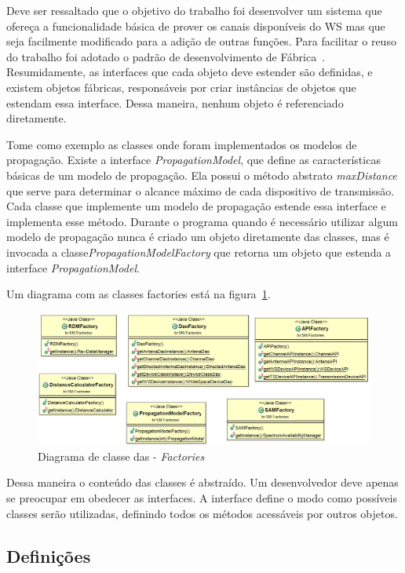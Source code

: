 Deve ser ressaltado que o objetivo do trabalho foi desenvolver um sistema que ofereça a funcionalidade básica de prover os canais disponíveis do WS mas que seja facilmente modificado para a adição de outras funções. Para facilitar o reuso do trabalho foi adotado o padrão de desenvolvimento de Fábrica~\cite{cooper2000java}. Resumidamente, as interfaces que cada objeto deve estender são definidas, e existem objetos fábricas, responsáveis por criar instâncias de objetos que estendam essa interface. Dessa maneira, nenhum objeto é referenciado diretamente.


 Tome como exemplo as classes onde foram implementados os modelos de propagação. Existe a interface \textit{PropagationModel}, que define as características básicas de um modelo de propagação. Ela possui o método abstrato \textit{maxDistance} que serve para determinar o alcance máximo de cada dispositivo de transmissão. Cada classe que implemente um modelo de propagação estende essa interface  e implementa esse método. Durante o programa quando é necessário utilizar algum modelo de propagação nunca é criado um objeto diretamente das classes, mas é invocada a classe\textit{PropagationModelFactory} que retorna um objeto que estenda a interface \textit{PropagationModel}.

Um diagrama com as classes factories está na figura~\ref{fig:facto}.

\begin{figure}[htb]
\centering
\includegraphics[width=1.0\textwidth]{figs/factories}
\caption[\textit{Factories}.]
{Diagrama de classe das - \textit{Factories} }
\label{fig:facto}
\end{figure} 


Dessa maneira o conteúdo das classes é abstraído. Um desenvolvedor deve apenas se preocupar em obedecer as interfaces. A interface define o modo como possíveis classes serão utilizadas, definindo todos os métodos acessáveis por outros objetos.


\subsection{Definições}

